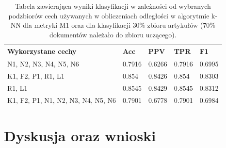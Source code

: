 \documentclass{classrep}
\begin{document}
\begin{table}[H]
    \centering
\caption{Tabela zawierająca wyniki klasyfikacji w zależności od wybranych podzbiorów cech używanych w obliczeniach odległości w algorytmie k-NN dla metryki M1 oraz dla klasyfikacji 30\% zbioru artykułów (70\% dokumentów należało do zbioru uczącego).}
\begin{adjustbox}{max width=\textwidth}
    \begin{tabular}{|l|l|l|l|l|}
    \hline
        Wykorzystane cechy & Acc & PPV & TPR & F1 \\ \hline
        N1, N2, N3, N4, N5, N6 & 0.7916 & 0.6266 & 0.7916 & 0.6995 \\ \hline
        K1, F2, P1, R1, L1 & 0.854 & 0.8426 & 0.854 & 0.8303 \\ \hline
        R1, L1 & 0.8545 & 0.8429 & 0.8545 & 0.8312 \\ \hline
        K1, F2, P1, N1, N2, N3, N4, N5, N6 & 0.7901 & 0.6778 & 0.7901 & 0.6984 \\ \hline
    \end{tabular}
\end{adjustbox}
\end{table}

\section{Dyskusja oraz wnioski}




\end{document}

